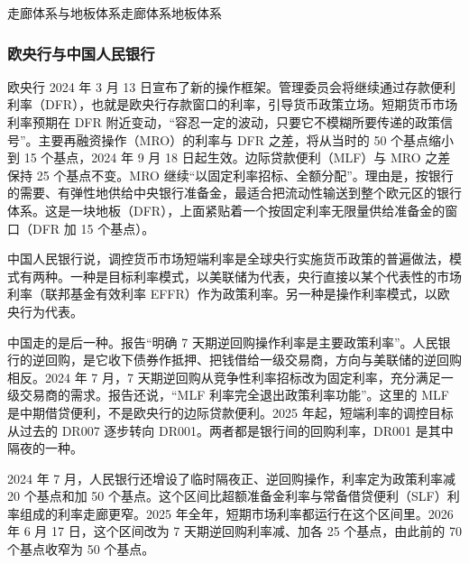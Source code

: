 \begin{compare}{走廊体系与地板体系}{走廊体系}{地板体系}
\end{compare}

\subsubsection{欧央行与中国人民银行}
欧央行 2024 年 3 月 13 日宣布了新的操作框架。管理委员会将继续通过存款便利利率（DFR），也就是欧央行存款窗口的利率，引导货币政策立场。短期货币市场利率预期在 DFR 附近变动，“容忍一定的波动，只要它不模糊所要传递的政策信号”\cite{ecb2024}。主要再融资操作（MRO）的利率与 DFR 之差，将从当时的 50 个基点缩小到 15 个基点，2024 年 9 月 18 日起生效。边际贷款便利（MLF）与 MRO 之差保持 25 个基点不变。MRO 继续“以固定利率招标、全额分配”\cite{ecb2024}。理由是，按银行的需要、有弹性地供给中央银行准备金，最适合把流动性输送到整个欧元区的银行体系\cite{ecb2024}。这是一块地板（DFR），上面紧贴着一个按固定利率无限量供给准备金的窗口（DFR 加 15 个基点）。

中国人民银行说，调控货币市场短端利率是全球央行实施货币政策的普遍做法，模式有两种。一种是目标利率模式，以美联储为代表，央行直接以某个代表性的市场利率（联邦基金有效利率 EFFR）作为政策利率。另一种是操作利率模式，以欧央行为代表\cite{pbc2026q2}。

中国走的是后一种。报告“明确 7 天期逆回购操作利率是主要政策利率”。人民银行的逆回购，是它收下债券作抵押、把钱借给一级交易商，方向与美联储的逆回购相反。2024 年 7 月，7 天期逆回购从竞争性利率招标改为固定利率，充分满足一级交易商的需求。报告还说，“MLF 利率完全退出政策利率功能”。这里的 MLF 是中期借贷便利，不是欧央行的边际贷款便利。2025 年起，短端利率的调控目标从过去的 DR007 逐步转向 DR001\cite{pbc2026q2}。两者都是银行间的回购利率，DR001 是其中隔夜的一种。

2024 年 7 月，人民银行还增设了临时隔夜正、逆回购操作，利率定为政策利率减 20 个基点和加 50 个基点。这个区间比超额准备金利率与常备借贷便利（SLF）利率组成的利率走廊更窄\cite{pbc2026q2}。2025 年全年，短期市场利率都运行在这个区间里\cite{pbc2025q4}。2026 年 6 月 17 日，这个区间改为 7 天期逆回购利率减、加各 25 个基点，由此前的 70 个基点收窄为 50 个基点\cite{pbc2026q2}。

